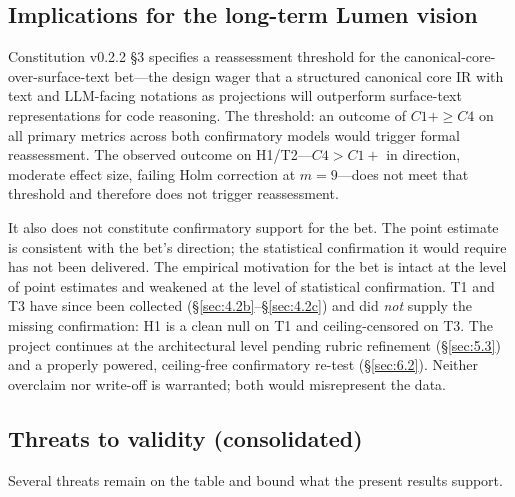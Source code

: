 \documentclass[11pt]{article}
\begin{document}
\subsection{Implications for the long-term Lumen vision}
\label{sec:5.4}
Constitution v0.2.2 \S3 specifies a reassessment threshold for
the canonical-core-over-surface-text bet---the design wager
that a structured canonical core IR with text and LLM-facing
notations as projections will outperform surface-text
representations for code reasoning. The threshold: an outcome
of $C1+ \geq C4$ on all primary metrics across both confirmatory
models would trigger formal reassessment. The observed outcome on
H1/T2---$C4 > C1+$ in direction, moderate effect size, failing
Holm correction at $m = 9$---does not meet that threshold and
therefore does not trigger reassessment.

It also does not constitute confirmatory support for the bet.
The point estimate is consistent with the bet's direction; the
statistical confirmation it would require has not been delivered.
The empirical motivation for the bet is intact at the level of
point estimates and weakened at the level of statistical
confirmation. T1 and T3 have since been collected
(\S\ref{sec:4.2b}--\S\ref{sec:4.2c}) and did \emph{not} supply the
missing confirmation: H1 is a clean null on T1 and ceiling-censored on
T3. The project continues at the architectural level pending rubric
refinement (\S\ref{sec:5.3}) and a properly powered, ceiling-free
confirmatory re-test (\S\ref{sec:6.2}). Neither overclaim nor write-off
is warranted; both would misrepresent the data.

\subsection{Threats to validity (consolidated)}
\label{sec:5.5}
Several threats remain on the table and bound what the present
results support.
\end{document}
